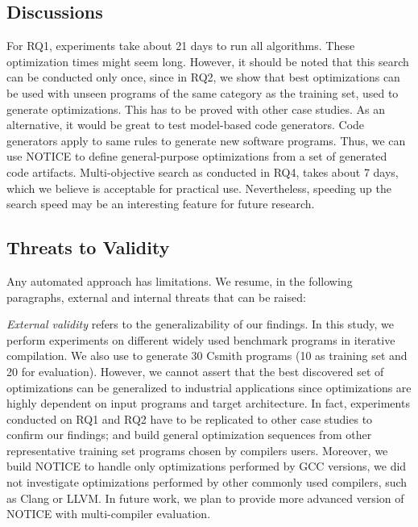 \noindent{}
\subsection{Discussions}
For RQ1, experiments take about 21 days to run all algorithms. These optimization times might seem long. However, it should be noted that this search can be conducted only once, since in RQ2, we show that best optimizations can be used with unseen programs of the same category as the training set, used to generate optimizations. This has to be proved with other case studies. As an alternative, it would be great to test model-based code generators. Code generators apply to same rules to generate new software programs. Thus, we can use NOTICE to define general-purpose optimizations from a set of generated code artifacts. 
Multi-objective search as conducted in RQ4, takes about 7 days, which we believe is acceptable for practical use. Nevertheless, speeding up the search speed
may be an interesting feature for future research.



\subsection{Threats to Validity}
Any automated approach has limitations. We resume, in the following paragraphs, external and internal threats that can be raised:
 
\textit{External validity} refers to the generalizability of our findings. In this study, we perform experiments on different widely used benchmark programs in iterative compilation. We also use to generate 30 Csmith programs (10 as training set and 20 for evaluation). However, we cannot assert that the best discovered set of optimizations can be generalized to industrial applications since optimizations are highly dependent on input programs and target architecture. In fact, experiments conducted on RQ1 and RQ2 have to be replicated to other case studies to confirm our findings; and build general optimization sequences from other representative training set programs chosen by compilers users.
Moreover, we build NOTICE to handle only optimizations performed by GCC versions, we did not investigate optimizations performed by other commonly used compilers, such as Clang or LLVM. In future work, we plan to provide more advanced version of NOTICE with multi-compiler evaluation.

